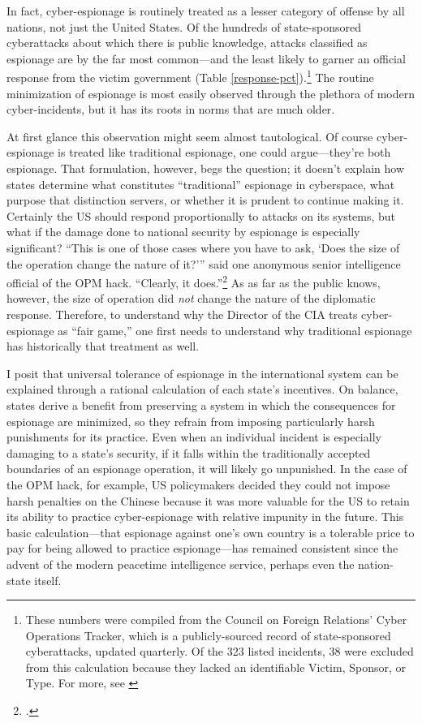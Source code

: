 \documentclass[14pt]{extarticle}
\begin{document}
In fact, cyber-espionage is routinely treated as a lesser category of offense by all nations, not just the United States. Of the hundreds of state-sponsored cyberattacks about which there is public knowledge, attacks classified as espionage are by the far most common---and the least likely to garner an official response from the victim government (Table \ref{response-pct}).\footnote{These numbers were compiled from the Council on Foreign Relations' Cyber Operations Tracker, which is a publicly-sourced record of state-sponsored cyberattacks, updated quarterly. Of the 323 listed incidents, 38 were excluded from this calculation because they lacked an identifiable Victim, Sponsor, or Type. For more, see \cite{council_on_foreign_relations_new_2019}} The routine minimization of espionage is most easily observed through the plethora of modern cyber-incidents, but it has its roots in norms that are much older.

At first glance this observation might seem almost tautological. Of course cyber-espionage is treated like traditional espionage, one could argue---they're both espionage. That formulation, however, begs the question; it doesn't explain how states determine what constitutes \enquote{traditional} espionage in cyberspace, what purpose that distinction servers, or whether it is prudent to continue making it. Certainly the US should respond proportionally to attacks on its systems, but what if the damage done to national security by espionage is especially significant? ``This is one of those cases where you have to ask, `Does the size of the operation change the nature of it?'\thinspace'' said one anonymous senior intelligence official of the OPM hack. ``Clearly, it does.''\footcite{sanger_u.s._2015} As as far as the public knows, however, the size of operation did \emph{not} change the nature of the diplomatic response. Therefore, to understand why the Director of the CIA treats cyber-espionage as \enquote{fair game,} one first needs to understand why traditional espionage has historically that treatment as well.

I posit that universal tolerance of espionage in the international system can be explained through a rational calculation of each state's incentives. On balance, states derive a benefit from preserving a system in which the consequences for espionage are minimized, so they refrain from imposing particularly harsh punishments for its practice. Even when an individual incident is especially damaging to a state's security, if it falls within the traditionally accepted boundaries of an espionage operation, it will likely go unpunished. In the case of the OPM hack, for example, US policymakers decided they could not impose harsh penalties on the Chinese because it was more valuable for the US to retain its ability to practice cyber-espionage with relative impunity in the future. This basic calculation---that espionage against one's own country is a tolerable price to pay for being allowed to practice espionage---has remained consistent since the advent of the modern peacetime intelligence service, perhaps even the nation-state itself.
\end{document}
